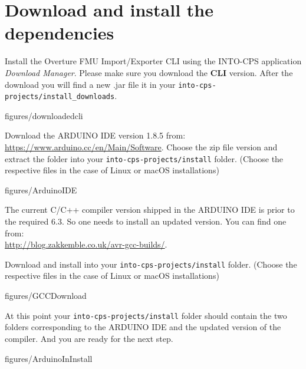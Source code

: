 \documentclass[11pt,a4paper]{../tutorial}
\begin{document}
\newpage
\section{Download and install the dependencies}


\begin{instructions} 

\item Install the Overture FMU Import/Exporter CLI using the INTO-CPS
	application \emph{Download Manager}. Please make sure you download the
	\textbf{CLI} version. After the download you will find a new .jar file it in your \texttt{into-cps-projects/install\_downloads}. 
	
	\begin{annotation}[width=0.85\linewidth]{figures/downloadedcli}
	\end{annotation}

	\newpage
\item Download the ARDUINO IDE version 1.8.5 from:\\
	\url{https://www.arduino.cc/en/Main/Software}.  Choose the zip file
	version and extract the folder into your
	\texttt{into-cps-projects/install} folder. (Choose the respective files in the case of Linux or macOS installations)

	\begin{annotation}[width=0.85\linewidth, trim= {0 6cm 0 0},clip]{figures/ArduinoIDE}
	\end{annotation}


\item The current C/C++ compiler version shipped in the ARDUINO IDE is prior to the required 6.3. So one needs to install an updated version. You can find one from:\\
	\url{http://blog.zakkemble.co.uk/avr-gcc-builds/}. 
	
	Download and install into your  \texttt{into-cps-projects/install} folder. (Choose the respective files in the case of Linux or macOS installations)


	\begin{annotation}[width=0.85\linewidth, trim= {0 6cm 0 0},clip]{figures/GCCDownload}
	\end{annotation}

\newpage
\item At this point your \texttt{into-cps-projects/install} folder should contain the two folders corresponding to the ARDUINO IDE and the updated version of the compiler. And you are ready for the next step. 

	\begin{annotation}[width=0.85\linewidth]{figures/ArduinoInInstall}
	\end{annotation}
\newpage
\end{instructions}
\end{document}
